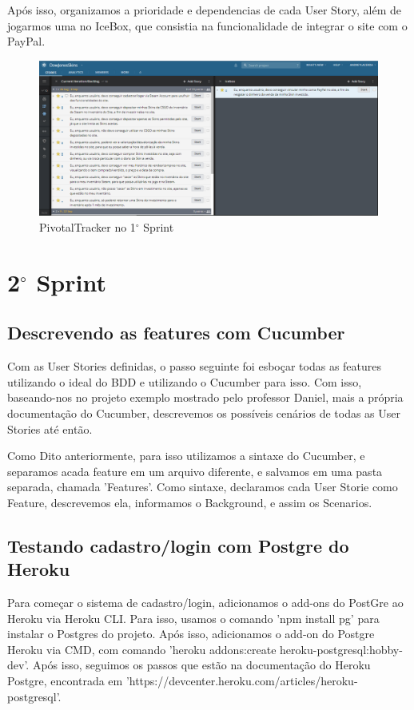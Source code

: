 \documentclass[a4paper,12pt]{article}
\begin{document}
    Após isso, organizamos a prioridade e dependencias de cada User Story, além de jogarmos uma no IceBox, que 
    consistia na funcionalidade de integrar o site com o PayPal.\\
    \begin{figure}[!htb]
        \centering
        \includegraphics[scale=0.4]{Imagens/Pivotal1.png}
        \caption{PivotalTracker no 1$^{\circ}$ Sprint}
    \end{figure}

    \section{2$^{\circ}$ Sprint}
    \subsection{Descrevendo as features com Cucumber}
    Com as User Stories definidas, o passo seguinte foi esboçar todas as features utilizando o ideal do BDD 
    e utilizando o Cucumber para isso. Com isso, baseando-nos no projeto exemplo mostrado pelo professor Daniel, 
    mais a própria documentação do Cucumber, descrevemos os possíveis cenários de todas as User Stories até então.
    
    Como Dito anteriormente, para isso utilizamos a sintaxe do Cucumber, e separamos acada feature em um arquivo diferente, 
    e salvamos em uma pasta separada, chamada 'Features'. 
    Como sintaxe, declaramos cada User Storie como Feature, descrevemos ela, informamos o Background, e assim os Scenarios.

    \subsection{Testando cadastro/login com Postgre do Heroku}
    Para começar o sistema de cadastro/login, adicionamos o add-ons do PostGre ao Heroku via Heroku CLI. Para isso, 
    usamos o comando 'npm install pg' para instalar o Postgres do projeto. Após isso, adicionamos o add-on do Postgre 
    Heroku via CMD, com comando 'heroku addons:create heroku-postgresql:hobby-dev'. Após isso, seguimos os passos 
    que estão na documentação do Heroku Postgre, encontrada em 'https://devcenter.heroku.com/articles/heroku-postgresql'.
\end{document}
